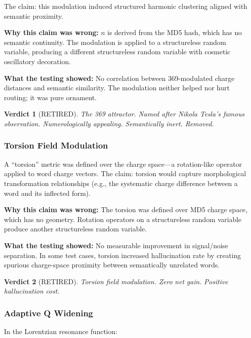 \documentclass[11pt]{article}
\newtheorem{verdict}{Verdict}
\begin{document}
The claim: this modulation induced structured harmonic clustering aligned with semantic proximity.

\textbf{Why this claim was wrong:} $n$ is derived from the MD5 hash, which has no semantic continuity. The modulation is applied to a structureless random variable, producing a different structureless random variable with cosmetic oscillatory decoration.

\textbf{What the testing showed:} No correlation between 369-modulated charge distances and semantic similarity. The modulation neither helped nor hurt routing; it was pure ornament.

\begin{verdict}[\textcolor{warnyellow}{RETIRED}]
The 369 attractor. Named after Nikola Tesla's famous observation. Numerologically appealing. Semantically inert. Removed.
\end{verdict}

\subsubsection{Torsion Field Modulation}

A ``torsion'' metric was defined over the charge space---a rotation-like operator applied to word charge vectors. The claim: torsion would capture morphological transformation relationships (e.g., the systematic charge difference between a word and its inflected form).

\textbf{Why this claim was wrong:} The torsion was defined over MD5 charge space, which has no geometry. Rotation operators on a structureless random variable produce another structureless random variable.

\textbf{What the testing showed:} No measurable improvement in signal/noise separation. In some test cases, torsion increased hallucination rate by creating spurious charge-space proximity between semantically unrelated words.

\begin{verdict}[\textcolor{warnyellow}{RETIRED}]
Torsion field modulation. Zero net gain. Positive hallucination cost.
\end{verdict}

\subsubsection{Adaptive Q Widening}

In the Lorentzian resonance function:
\end{document}
